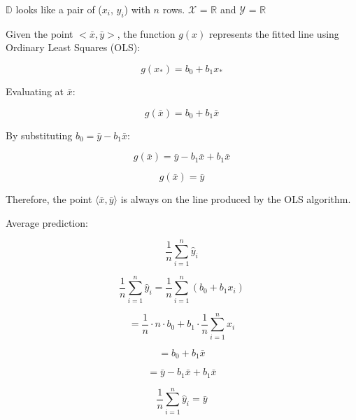 \documentclass[12pt]{article}
\begin{document}

\begin{enumerate}


$\mathbb{D}$ looks like a pair of ($x_i$, $y_i$) with $n$ rows. $\mathcal{X}$ = $\mathbb{R}$ and $\mathcal{Y}$ = $\mathbb{R}$



Given the point \(< \bar{x}, \bar{y} > \), the function \( g(x) \) represents the fitted line using Ordinary Least Squares (OLS):

\[
g(x_*) = b_0 + b_1 x_*
\]

Evaluating at \( \bar{x} \):

\[
g(\bar{x}) = b_0 + b_1 \bar{x}
\]

By substituting \(b_0 = \bar{y} - b_1 \bar{x} \):

\[
g(\bar{x}) = \bar{y} - b_1 \bar{x} + b_1 \bar{x}
\]

\[
g(\bar{x}) = \bar{y}
\]

Therefore, the point \( \langle \bar{x}, \bar{y} \rangle \) is always on the line produced by the OLS algorithm.




Average prediction:

\[
\frac{1}{n} \sum_{i=1}^{n} \hat{y}_i
\]

\[
\frac{1}{n} \sum_{i=1}^{n} \hat{y}_i = \frac{1}{n} \sum_{i=1}^{n} (b_0 + b_1 x_i)
\]

\[
= \frac{1}{n} \cdot n \cdot b_0 + b_1 \cdot \frac{1}{n} \sum_{i=1}^{n} x_i
\]

\[
= b_0 + b_1 \bar{x}
\]

\[
= \bar{y} - b_1 \bar{x} + b_1 \bar{x}
\]

\[
\frac{1}{n} \sum_{i=1}^{n} \hat{y}_i = \bar{y}
\]




\end{enumerate}
\end{document}
